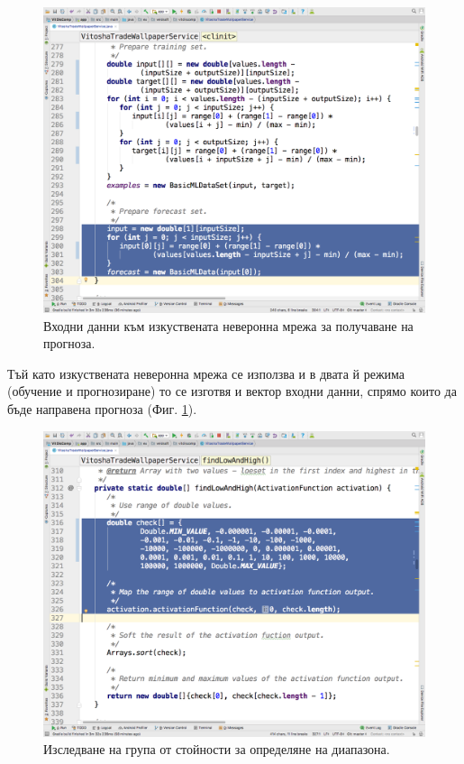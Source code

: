 \documentclass[book,14pt,oneside,openany]{memoir}
\begin{document}
\begin{figure}[h]
  \centering
  \includegraphics[height=0.45\pdfpageheight]{./images/pic0042.png}
  \caption{Входни данни към изкуствената неверонна мрежа за получаване на прогноза.}
\label{fig:pic0042}
\end{figure}
\FloatBarrier

Тъй като изкуствената неверонна мрежа се използва и в двата й режима (обучение и прогнозиране) то се изготвя и вектор входни данни, спрямо които да бъде направена прогноза (Фиг. \ref{fig:pic0042}).

\begin{figure}[h]
  \centering
  \includegraphics[height=0.45\pdfpageheight]{./images/pic0043.png}
  \caption{Изследване на група от стойности за определяне на диапазона.}
\label{fig:pic0043}
\end{figure}
\FloatBarrier
\end{document}
